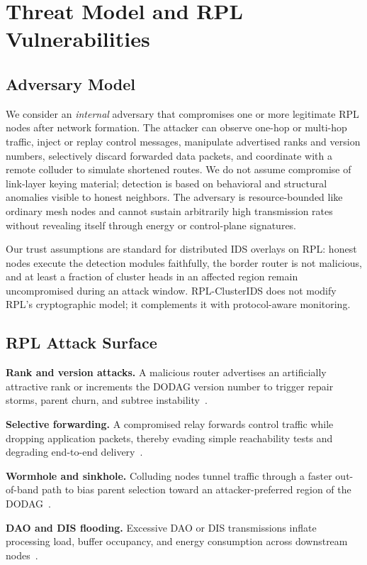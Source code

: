 \section{Threat Model and RPL Vulnerabilities}
\label{sec:threat}

\subsection{Adversary Model}
We consider an \emph{internal} adversary that compromises one or more legitimate RPL nodes after network formation.
The attacker can observe one-hop or multi-hop traffic, inject or replay control messages, manipulate advertised ranks and version numbers, selectively discard forwarded data packets, and coordinate with a remote colluder to simulate shortened routes.
We do not assume compromise of link-layer keying material; detection is based on behavioral and structural anomalies visible to honest neighbors.
The adversary is resource-bounded like ordinary mesh nodes and cannot sustain arbitrarily high transmission rates without revealing itself through energy or control-plane signatures.

Our trust assumptions are standard for distributed IDS overlays on RPL: honest nodes execute the detection modules faithfully, the border router is not malicious, and at least a fraction of cluster heads in an affected region remain uncompromised during an attack window.
RPL-ClusterIDS does not modify RPL's cryptographic model; it complements it with protocol-aware monitoring.

\subsection{RPL Attack Surface}
\textbf{Rank and version attacks.}
A malicious router advertises an artificially attractive rank or increments the DODAG version number to trigger repair storms, parent churn, and subtree instability~\cite{mayzaud2016,rfc7416}.

\textbf{Selective forwarding.}
A compromised relay forwards control traffic while dropping application packets, thereby evading simple reachability tests and degrading end-to-end delivery~\cite{karlof2003}.

\textbf{Wormhole and sinkhole.}
Colluding nodes tunnel traffic through a faster out-of-band path to bias parent selection toward an attacker-preferred region of the DODAG~\cite{hu2006}.

\textbf{DAO and DIS flooding.}
Excessive DAO or DIS transmissions inflate processing load, buffer occupancy, and energy consumption across downstream nodes~\cite{raza2017}.


